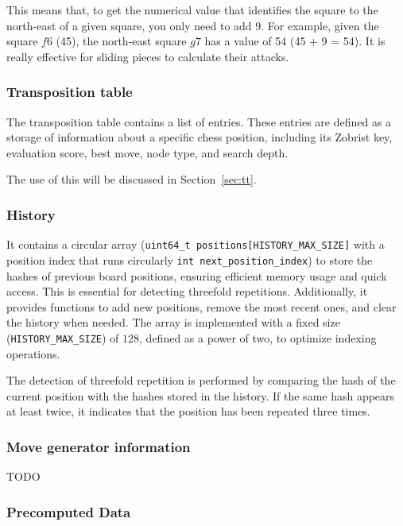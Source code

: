 \noindent This means that, to get the numerical value that identifies the square to the north-east of a given square, you only need to add 9. For example, given the square $f6$ (45), the north-east square $g7$ has a value of 54 (45 + 9 = 54). It is really effective for sliding pieces to calculate their attacks.

\subsubsection{Transposition table}

The transposition table contains a list of entries. These entries are defined as a storage of information about a specific chess position, including its Zobrist key, evaluation score, best move, node type, and search depth.

\vspace{1em}

\noindent The use of this will be discussed in Section~\ref{sec:tt}.

\subsubsection{History}

It contains a circular array (\texttt{uint64\_t positions[HISTORY\_MAX\_SIZE]} with a position index that runs circularly \texttt{int next\_position\_index}) to store the hashes of previous board positions, ensuring efficient memory usage and quick access. This is essential for detecting threefold repetitions. Additionally, it provides functions to add new positions, remove the most recent ones, and clear the history when needed. The array is implemented with a fixed size (\texttt{HISTORY\_MAX\_SIZE}) of \(128\), defined as a power of two, to optimize indexing operations.

\vspace{1em}

\noindent The detection of threefold repetition is performed by comparing the hash of the current position with the hashes stored in the history. If the same hash appears at least twice, it indicates that the position has been repeated three times.

\subsubsection{Move generator information}

TODO

\subsubsection{Precomputed Data}

